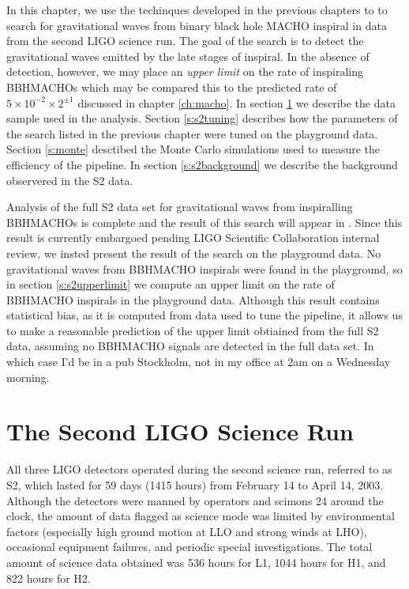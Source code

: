 
In this chapter, we use the techinques developed in the previous chapters to
to search for gravitational waves from binary black hole MACHO inspiral in
data from the second LIGO science run.  The goal of the search is to detect
the gravitational waves emitted by the late stages of inspiral. In the absence
of detection, however, we may place an \emph{upper limit} on the rate of
inspiraling BBHMACHOs which may be compared this to the predicted rate of $5
\times 10^{-2} \times 2^{\pm 1}$ discussed in chapter \ref{ch:macho}.  In
section \ref{s:s2run} we describe the data sample used in the analysis.
Section \ref{s:s2tuning} describes how the parameters of the search listed in
the previous chapter were tuned on the playground data. Section \ref{s:monte}
desctibed the Monte Carlo simulations used to measure the efficiency of the
pipeline. In section \ref{s:s2background} we describe the background
observered in the S2 data.

Analysis of the full S2 data set for gravitational waves from inspiralling
BBHMACHOs is complete and the result of this search will appear in
\cite{S2Macho:2004}. Since this result is currently embargoed pending LIGO
Scientific Collaboration internal review, we insted present the result of the
search on the playground data. No gravitational waves from BBHMACHO inspirals
were found in the playground, so in section \ref{s:s2upperlimit} we compute
an upper limit on the rate of BBHMACHO inspirals in the playground data.
Although this result contains statistical bias, as it is computed from data
used to tune the pipeline, it allows us to make a reasonable prediction of the
upper limit obtiained from the full S2 data, assuming no BBHMACHO signals are
detected in the full data set. In which case I'd be in a pub Stockholm, not in
my office at 2am on a Wednesday morning.

\section{The Second LIGO Science Run}
\label{s:s2run}

All three LIGO detectors operated during the second science run, referred to
as S2, which lasted for 59 days (1415 hours) from February 14 to April 14,
2003.  Although the detectors were manned by operators and scimons 24 around
the clock, the amount of data flagged as science mode was limited by
environmental factors (especially high ground motion at LLO and strong winds
at LHO), occasional equipment failures, and periodic special investigations.
The total amount of science data obtained was 536 hours for L1, 1044 hours for
H1, and 822 hours for H2.

